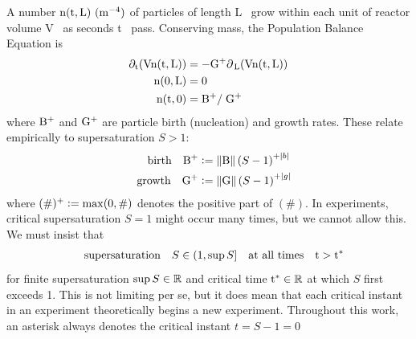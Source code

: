 \documentclass[a4paper]{base}
\newcommand{\crit}[1]{\M{#1^{*}}}
\newcommand{\pdn}[1]{\partial_{\,\dn{#1}}}
\begin{document}
    
    A number $\dn{n(t,L)}~\un{m^{-4}}$ of particles of length L~ grow within each unit of reactor volume V~ as seconds t~ pass. 
    Conserving mass, the Population Balance Equation is
    \begin{equation}\label{eq:Intro:PBE}
        \begin{aligned}
            \dn{\partial_{t} (V n(t,L))} &= -\dn{G^{+} \pdn{L} (V \dn{n}(t,L))}\\
            \dn{n(0, L)} &= 0 \\
            \dn{n(t,0)} &= \dn{B^{+}/\; G^{+}}
        \end{aligned}
    \end{equation}
    where $\dn{B^{+}}$  and $\dn{G^{+}}$  are particle birth (nucleation) and growth rates. These relate empirically to supersaturation $S>1$:
    \begin{equation}\label{def:Intro:BG+}
        \begin{aligned}
            \QT{birth} \dn{B^{+}} &\deq \norm{\dn{B}} \left(S-1\right)^{+\mds{b}} \\
            \QT{growth} \dn{G^{+}} &\deq \norm{\dn{G}} \left(S-1\right)^{+\mds{g}}
        \end{aligned}
    \end{equation}
    where $(\#)^{+} \mathrel{\mathop:}= \max(0, \#)$ denotes the positive part of $(\#)$. In experiments, critical supersaturation $S=1$ might occur many times, but we cannot allow this. We must insist that
    \begin{equation}\label{def:Intro:crit}
        \begin{aligned}
            \QT{supersaturation} S \in \opclo{1}{\sup S} \QT{at all times} \dn{t}>\crit{\dn{t}}
        \end{aligned}
    \end{equation}
    for finite supersaturation $\sup{S}\in\mathbb{R}$ and critical time $\crit{\dn{t}}\in\bb{R}$ at which $S$ first exceeds 1. This is not limiting per se, but it does mean that each critical instant in an experiment theoretically begins a new experiment. 
    Throughout this work, an asterisk always denotes the critical instant $t=S-1=0$
\end{document}
